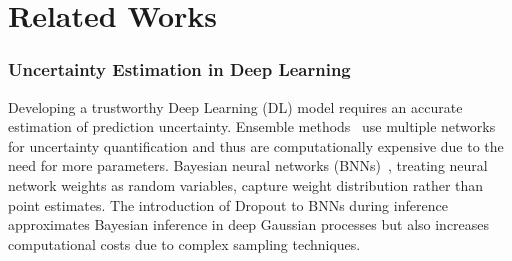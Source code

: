 \section{Related Works}
\subsubsection{Uncertainty Estimation in Deep Learning} 
Developing a trustworthy Deep Learning (DL) model requires an accurate estimation of prediction uncertainty. Ensemble methods~\cite{pearce2020uncertainty,lakshminarayanan2017simple} use multiple networks for uncertainty quantification and thus are computationally expensive due to the need for more parameters. Bayesian neural networks (BNNs)~\cite{gal2016dropout,wilson2020bayesian,blundell2015weight}, treating neural network weights as random variables, capture weight distribution rather than point estimates. The introduction of Dropout to BNNs during inference~\cite{gal2016dropout} approximates Bayesian inference in deep Gaussian processes but also increases computational costs due to complex sampling techniques. 



